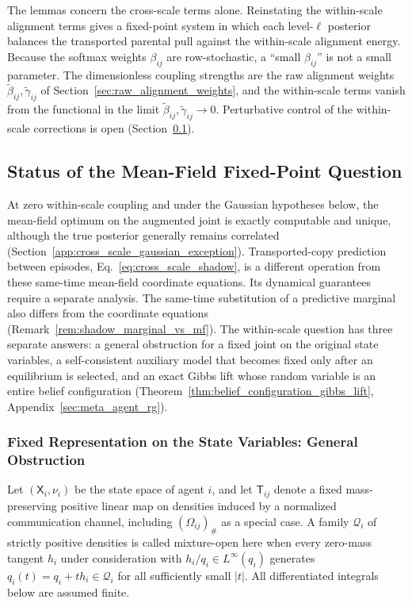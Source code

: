 The lemmas concern the cross-scale terms alone. Reinstating the within-scale alignment terms gives a fixed-point system in which each level-$\ell$ posterior balances the transported parental pull against the within-scale alignment energy. Because the softmax weights $\beta_{ij}$ are row-stochastic, a ``small $\beta_{ij}$'' is not a small parameter. The dimensionless coupling strengths are the raw alignment weights $\tilde\beta_{ij}, \tilde\gamma_{ij}$ of Section~\ref{sec:raw_alignment_weights}, and the within-scale terms vanish from the functional in the limit $\tilde\beta_{ij}, \tilde\gamma_{ij} \to 0$. Perturbative control of the within-scale corrections is open (Section~\ref{app:mf_fixedpoint_status}).

\subsection{Status of the Mean-Field Fixed-Point Question}
\label{app:mf_fixedpoint_status}

At zero within-scale coupling and under the Gaussian hypotheses below, the mean-field optimum on the augmented joint is exactly computable and unique, although the true posterior generally remains correlated (Section~\ref{app:cross_scale_gaussian_exception}). Transported-copy prediction between episodes, Eq.~\eqref{eq:cross_scale_shadow}, is a different operation from these same-time mean-field coordinate equations. Its dynamical guarantees require a separate analysis. The same-time substitution of a predictive marginal also differs from the coordinate equations (Remark~\ref{rem:shadow_marginal_vs_mf}). The within-scale question has three separate answers: a general obstruction for a fixed joint on the original state variables, a self-consistent auxiliary model that becomes fixed only after an equilibrium is selected, and an exact Gibbs lift whose random variable is an entire belief configuration (Theorem~\ref{thm:belief_configuration_gibbs_lift}, Appendix~\ref{sec:meta_agent_rg}).

\subsubsection{Fixed Representation on the State Variables: General Obstruction}

Let $(\mathsf{X}_i,\nu_i)$ be the state space of agent $i$, and let $\mathsf{T}_{ij}$ denote a fixed mass-preserving positive linear map on densities induced by a normalized communication channel, including $(\Omega_{ij})_\#$ as a special case. A family $\mathcal{Q}_i$ of strictly positive densities is called mixture-open here when every zero-mass tangent $h_i$ under consideration with $h_i/q_i\in L^\infty(q_i)$ generates $q_i(t)=q_i+t h_i\in\mathcal{Q}_i$ for all sufficiently small $|t|$. All differentiated integrals below are assumed finite.

